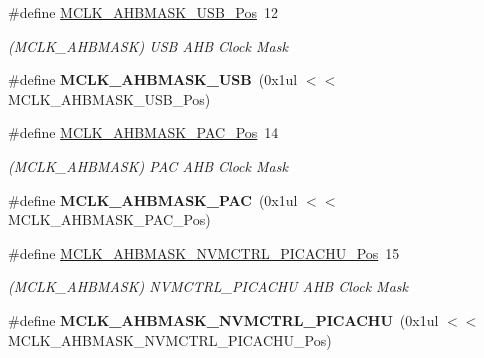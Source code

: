 \begin{DoxyCompactItemize}
\item 
\hypertarget{group___s_a_m_l21___m_c_l_k_ga58c4b1c4ee77bdcf758d0e74ec5b5abc}{}\#define \hyperlink{group___s_a_m_l21___m_c_l_k_ga58c4b1c4ee77bdcf758d0e74ec5b5abc}{M\+C\+L\+K\+\_\+\+A\+H\+B\+M\+A\+S\+K\+\_\+\+U\+S\+B\+\_\+\+Pos}~12\label{group___s_a_m_l21___m_c_l_k_ga58c4b1c4ee77bdcf758d0e74ec5b5abc}

\begin{DoxyCompactList}\small\item\em (M\+C\+L\+K\+\_\+\+A\+H\+B\+M\+A\+S\+K) U\+S\+B A\+H\+B Clock Mask \end{DoxyCompactList}\item 
\hypertarget{group___s_a_m_l21___m_c_l_k_gac0f4944f37bde2fe7e8d7fe87ca957fb}{}\#define {\bfseries M\+C\+L\+K\+\_\+\+A\+H\+B\+M\+A\+S\+K\+\_\+\+U\+S\+B}~(0x1ul $<$$<$ M\+C\+L\+K\+\_\+\+A\+H\+B\+M\+A\+S\+K\+\_\+\+U\+S\+B\+\_\+\+Pos)\label{group___s_a_m_l21___m_c_l_k_gac0f4944f37bde2fe7e8d7fe87ca957fb}

\item 
\hypertarget{group___s_a_m_l21___m_c_l_k_ga25f30a1fcd43fb869b5594496df8d1f1}{}\#define \hyperlink{group___s_a_m_l21___m_c_l_k_ga25f30a1fcd43fb869b5594496df8d1f1}{M\+C\+L\+K\+\_\+\+A\+H\+B\+M\+A\+S\+K\+\_\+\+P\+A\+C\+\_\+\+Pos}~14\label{group___s_a_m_l21___m_c_l_k_ga25f30a1fcd43fb869b5594496df8d1f1}

\begin{DoxyCompactList}\small\item\em (M\+C\+L\+K\+\_\+\+A\+H\+B\+M\+A\+S\+K) P\+A\+C A\+H\+B Clock Mask \end{DoxyCompactList}\item 
\hypertarget{group___s_a_m_l21___m_c_l_k_gaffaabbf8d69adeb59ff3f1a1e4b428dc}{}\#define {\bfseries M\+C\+L\+K\+\_\+\+A\+H\+B\+M\+A\+S\+K\+\_\+\+P\+A\+C}~(0x1ul $<$$<$ M\+C\+L\+K\+\_\+\+A\+H\+B\+M\+A\+S\+K\+\_\+\+P\+A\+C\+\_\+\+Pos)\label{group___s_a_m_l21___m_c_l_k_gaffaabbf8d69adeb59ff3f1a1e4b428dc}

\item 
\hypertarget{group___s_a_m_l21___m_c_l_k_gad05fb017381480b1f5c4925fe5b2a148}{}\#define \hyperlink{group___s_a_m_l21___m_c_l_k_gad05fb017381480b1f5c4925fe5b2a148}{M\+C\+L\+K\+\_\+\+A\+H\+B\+M\+A\+S\+K\+\_\+\+N\+V\+M\+C\+T\+R\+L\+\_\+\+P\+I\+C\+A\+C\+H\+U\+\_\+\+Pos}~15\label{group___s_a_m_l21___m_c_l_k_gad05fb017381480b1f5c4925fe5b2a148}

\begin{DoxyCompactList}\small\item\em (M\+C\+L\+K\+\_\+\+A\+H\+B\+M\+A\+S\+K) N\+V\+M\+C\+T\+R\+L\+\_\+\+P\+I\+C\+A\+C\+H\+U A\+H\+B Clock Mask \end{DoxyCompactList}\item 
\hypertarget{group___s_a_m_l21___m_c_l_k_ga2ae9f1568e029c3a1a067700c0a4723c}{}\#define {\bfseries M\+C\+L\+K\+\_\+\+A\+H\+B\+M\+A\+S\+K\+\_\+\+N\+V\+M\+C\+T\+R\+L\+\_\+\+P\+I\+C\+A\+C\+H\+U}~(0x1ul $<$$<$ M\+C\+L\+K\+\_\+\+A\+H\+B\+M\+A\+S\+K\+\_\+\+N\+V\+M\+C\+T\+R\+L\+\_\+\+P\+I\+C\+A\+C\+H\+U\+\_\+\+Pos)\label{group___s_a_m_l21___m_c_l_k_ga2ae9f1568e029c3a1a067700c0a4723c}


\end{DoxyCompactItemize}

